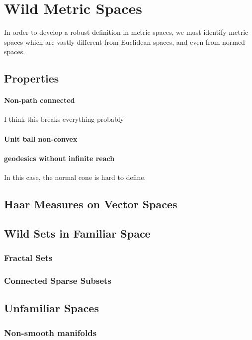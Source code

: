 \documentclass{article}
\theoremstyle{definition}
\theoremstyle{definition}
\theoremstyle{plain}
\renewcommand{\(}{\left(}
\renewcommand{\)}{\right)}
\begin{document}
\section{Wild Metric Spaces}
In order to develop a robust definition in metric spaces, we must identify metric spaces which are vastly different from Euclidean spaces, and even from normed spaces.

\subsection{Properties}
\paragraph{Non-path connected}
I think this breaks everything probably
\paragraph{Unit ball non-convex}

\paragraph{geodesics without infinite reach}
In this case, the normal cone is hard to define.
\paragraph{}
\subsection{Haar Measures on Vector Spaces}

\subsection{Wild Sets in Familiar Space}
\subsubsection*{Fractal Sets}
\subsubsection*{Connected Sparse Subsets}

\subsection{Unfamiliar Spaces}
\subsubsection*{Non-smooth manifolds}
\end{document}
